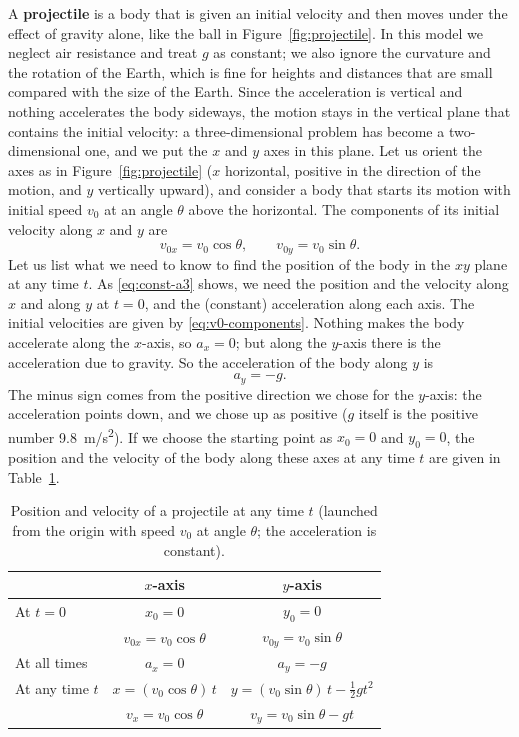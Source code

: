 \documentclass[11pt,a4paper]{article}
\begin{document}
A \textbf{projectile} is a body that is given an initial velocity and then moves under the effect
of gravity alone, like the ball in Figure~\ref{fig:projectile}. In this model we neglect air
resistance and treat $g$ as constant; we also ignore the curvature and the rotation of the Earth,
which is fine for heights and distances that are small compared with the size of the Earth. Since
the acceleration is vertical and nothing accelerates the body sideways, the motion stays in the
vertical plane that contains the initial velocity: a three-dimensional problem has become a
two-dimensional one, and we put the $x$ and $y$ axes in this plane. Let us orient the axes as in
Figure~\ref{fig:projectile} ($x$ horizontal, positive in the direction of the motion, and $y$
vertically upward), and consider a body that starts its motion with initial speed $v_0$ at an
angle $\theta$ above the horizontal. The components of its initial velocity along $x$ and $y$ are
\begin{equation}\label{eq:v0-components}
  v_{0x} = v_0\cos\theta , \qquad v_{0y} = v_0\sin\theta .
\end{equation}
Let us list what we need to know to find the position of the body in the $xy$ plane at any time
$t$. As \eqref{eq:const-a3} shows, we need the position and the velocity along $x$ and along $y$
at $t = 0$, and the (constant) acceleration along each axis. The initial velocities are given
by \eqref{eq:v0-components}. Nothing makes the body accelerate along the $x$-axis, so $a_x = 0$;
but along the $y$-axis there is the acceleration due to gravity. So the acceleration of the body
along $y$ is
\begin{equation}\label{eq:ay}
  a_y = -g .
\end{equation}
The minus sign comes from the positive direction we chose for the $y$-axis: the acceleration points
down, and we chose up as positive ($g$ itself is the positive number \qty{9.8}{m/s^2}). If we
choose the starting point as $x_0 = 0$ and $y_0 = 0$, the position and the velocity of the body
along these axes at any time $t$ are given in Table~\ref{tab:projectile}.

\begin{table}[ht]
\centering
\renewcommand{\arraystretch}{1.25}
\begin{tabular}{lcc}
\toprule
 & $x$-axis & $y$-axis \\
\midrule
At $t = 0$ & $x_0 = 0$ & $y_0 = 0$ \\
 & $v_{0x} = v_0\cos\theta$ & $v_{0y} = v_0\sin\theta$ \\
\midrule
At all times & $a_x = 0$ & $a_y = -g$ \\
\midrule
At any time $t$ & $x = (v_0\cos\theta)\,t$ & $y = (v_0\sin\theta)\,t - \frac12 gt^2$ \\
 & $v_x = v_0\cos\theta$ & $v_y = v_0\sin\theta - gt$ \\
\bottomrule
\end{tabular}
\caption{Position and velocity of a projectile at any time $t$ (launched from the origin with speed
$v_0$ at angle $\theta$; the acceleration is constant).}\label{tab:projectile}
\end{table}
\end{document}

